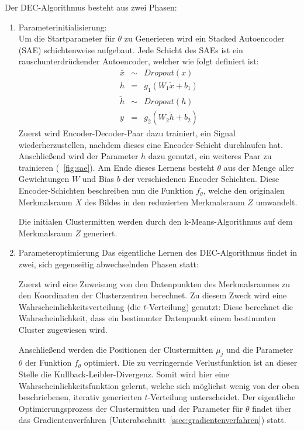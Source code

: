 Der DEC-Algorithmus besteht aus zwei Phasen:
\begin{enumerate}
	\item Parameterinitialisierung:\\
	Um die Startparameter für $\theta$ zu Generieren wird ein Stacked Autoencoder (SAE) schichtenweise aufgebaut. Jede Schicht des SAEs ist ein rauschunterdrückender Autoencoder, welcher wie folgt definiert ist: \cite{junyuan_16}
	\begin{eqnarray}
	\bar{x}&\sim&Dropout(x)\\
	h &=& g_1(W_1\tilde{x}+b_1)\\
	\tilde{h} &\sim& Dropout(h)\\
	y &=& g_2(W_2\tilde{h}+b_2)
	\end{eqnarray}
	Zuerst wird Encoder-Decoder-Paar dazu trainiert, ein Signal wiederherzustellen, nachdem dieses eine Encoder-Schicht durchlaufen hat. Anschließend wird der Parameter $h$ dazu genutzt, ein weiteres Paar zu trainieren (\vgl \figurename~\ref{fig:sae}). Am Ende dieses Lernens besteht $\theta$ aus der Menge aller Gewichtungen $W$ und Bias $b$ der verschiedenen Encoder Schichten. Diese Encoder-Schichten beschreiben nun die Funktion $f_\theta$, welche den originalen Merkmalsraum $X$ des Bildes in den reduzierten Merkmalsraum $Z$ umwandelt.
	
	Die initialen Clustermitten werden durch den k-Means-Algorithmus auf dem Merkmalsraum $Z$ generiert.
	
	\item Parameteroptimierung
	Das eigentliche Lernen des DEC-Algorithmus findet in zwei, sich gegenseitig abwechselnden Phasen statt:
	
	Zuerst wird eine Zuweisung von den Datenpunkten des Merkmalsraumes zu den Koordinaten der Clusterzentren berechnet. Zu diesem Zweck wird eine Wahrscheinlichkeitsverteilung (die $t$-Verteilung) genutzt: Diese berechnet die Wahrscheinlichkeit, dass ein bestimmter Datenpunkt einem bestimmten Cluster zugewiesen wird.
	
	Anschließend werden die Positionen der Clustermitten $\mu_j$ und die Parameter $\theta$ der Funktion $f_\theta$ optimiert. Die zu verringernde Verlustfunktion ist an dieser Stelle die Kullback-Leibler-Divergenz. Somit wird hier eine Wahrscheinlichkeitsfunktion gelernt, welche sich möglichst wenig von der oben beschriebenen, iterativ generierten $t$-Verteilung unterscheidet. Der eigentliche Optimierungsprozess der Clustermitten und der Parameter für $\theta$ findet über das Gradientenverfahren (\vgl Unterabschnitt~\ref{ssec:gradientenverfahren}) statt.
\end{enumerate}


